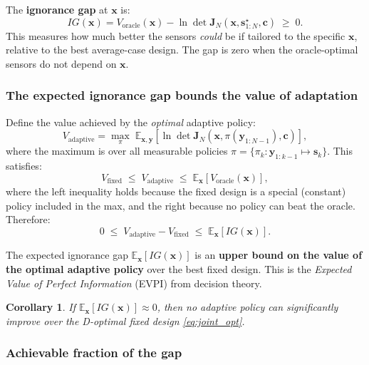 \documentclass[11pt,a4paper]{article}
\newcommand{\E}{\mathbb{E}}
\newtheorem{corollary}{Corollary}
\begin{document}
The \textbf{ignorance gap} at $\bm{x}$ is:
\begin{equation}
  \boxed{IG(\bm{x}) = V_{\text{oracle}}(\bm{x}) - \ln\det\bm{J}_N(\bm{x}, \bm{s}^\star_{1:N}, \bm{c}) \;\geq\; 0.}
  \label{eq:IG}
\end{equation}
This measures how much better the sensors \emph{could} be if tailored to the specific $\bm{x}$, relative to the best average-case design.  The gap is zero when the oracle-optimal sensors do not depend on $\bm{x}$.

\subsubsection{The expected ignorance gap bounds the value of adaptation}

Define the value achieved by the \emph{optimal} adaptive policy:
\begin{equation}
  V_{\text{adaptive}} = \max_{\pi}\;\E_{\bm{x}, \bm{y}}\!\left[\ln\det\bm{J}_N(\bm{x}, \pi(\bm{y}_{1:N-1}), \bm{c})\right],
\end{equation}
where the maximum is over all measurable policies $\pi = \{\pi_k: \bm{y}_{1:k-1} \mapsto \bm{s}_k\}$.  This satisfies:
\begin{equation}
  V_{\text{fixed}} \;\leq\; V_{\text{adaptive}} \;\leq\; \E_{\bm{x}}\!\left[V_{\text{oracle}}(\bm{x})\right],
  \label{eq:bounds}
\end{equation}
where the left inequality holds because the fixed design is a special (constant) policy included in the max, and the right because no policy can beat the oracle.  Therefore:
\begin{equation}
  \boxed{0 \;\leq\; V_{\text{adaptive}} - V_{\text{fixed}} \;\leq\; \E_{\bm{x}}\!\left[IG(\bm{x})\right].}
  \label{eq:evpi}
\end{equation}

The expected ignorance gap $\E_{\bm{x}}[IG(\bm{x})]$ is an \textbf{upper bound on the value of the optimal adaptive policy} over the best fixed design.  This is the \emph{Expected Value of Perfect Information} (EVPI) from decision theory.

\begin{corollary}
If $\E_{\bm{x}}[IG(\bm{x})] \approx 0$, then no adaptive policy can significantly improve over the D-optimal fixed design \eqref{eq:joint_opt}.
\end{corollary}

\subsubsection{Achievable fraction of the gap}
\end{document}
